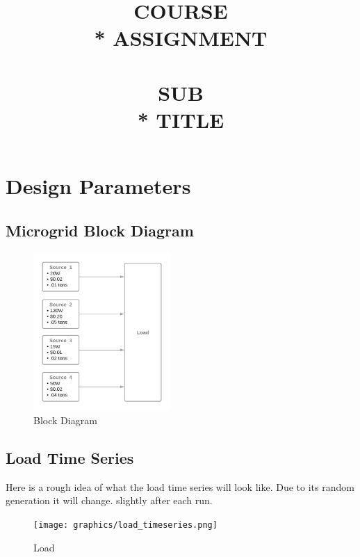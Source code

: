 \documentclass{article}
\title{\Huge{\textbf{COURSE}  \\* ASSIGNMENT \\~\\ \textbf{SUB \\* TITLE}}}
\date{} %
\begin{document}



\section{Design Parameters}
    \subsection{Microgrid Block Diagram}
    \begin{figure}[h!]
    \begin{center}
        \includegraphics[height=6cm]{graphics/block_diagram.png}
    \end{center}
    \caption{Block Diagram}
    \label{fig:block}
    \end{figure}

    \subsection{Load Time Series}
    Here is a rough idea of what the load time series will look like. Due to its random generation it will change. slightly after each run.
    \begin{figure}[h!]
        \begin{center}
            \texttt{[image: graphics/load\_timeseries.png]}
        \end{center}
        \caption{Load}
        \label{fig:load}
    \end{figure}
\end{document}
